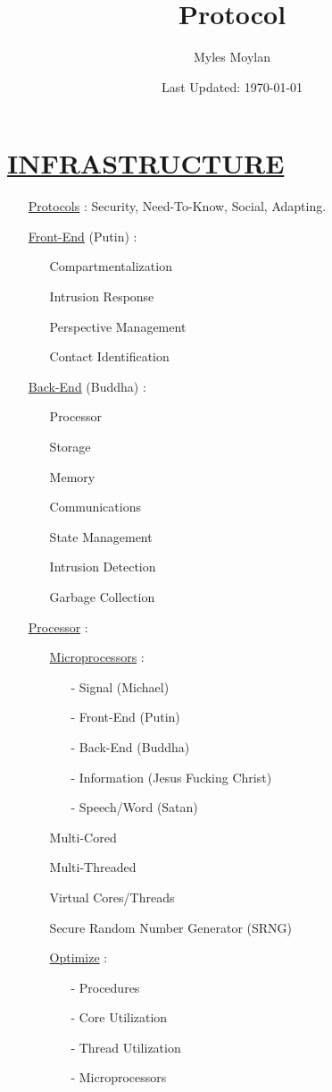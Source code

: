 \documentclass[11pt]{article}
\title{	
	\normalfont \normalsize 
	\huge Protocol
}
\author{Myles Moylan}
\date{Last Updated: \normalsize\today}
\begin{document}
\maketitle
\section*{\ul{INFRASTRUCTURE}}
\begin{enumerate}
	\item[] \ul{Protocols} : Security, Need-To-Know, Social, Adapting.
	
	\item[] \ul{Front-End} (Putin) :
	\begin{enumerate}
		\item[] Compartmentalization
		\item[] Intrusion Response
		\item[] Perspective Management
		\item[] Contact Identification
	\end{enumerate}

	\item[] \ul{Back-End} (Buddha) :
	\begin{enumerate}
		\item[] Processor
		\item[] Storage
		\item[] Memory
		\item[] Communications
		\item[] State Management
		\item[] Intrusion Detection
		\item[] Garbage Collection
	\end{enumerate}

	\item[] \ul{Processor} :
	\begin{enumerate}
		\item[] \ul{Microprocessors} :
		\begin{enumerate}
			\item[-] Signal (Michael)
			\item[-] Front-End (Putin)
			\item[-] Back-End (Buddha)
			\item[-] Information (Jesus Fucking Christ)
			\item[-] Speech/Word (Satan)
		\end{enumerate}
		\item[] Multi-Cored
		\item[] Multi-Threaded
		\item[] Virtual Cores/Threads
		\item[] Secure Random Number Generator (SRNG)
		\item[] \ul{Optimize}  :
		\begin{enumerate}
			\item[-] Procedures
			\item[-] Core Utilization
			\item[-] Thread Utilization
			\item[-] Microprocessors
		\end{enumerate}
	\end{enumerate}
	

\end{enumerate}
\end{document}
